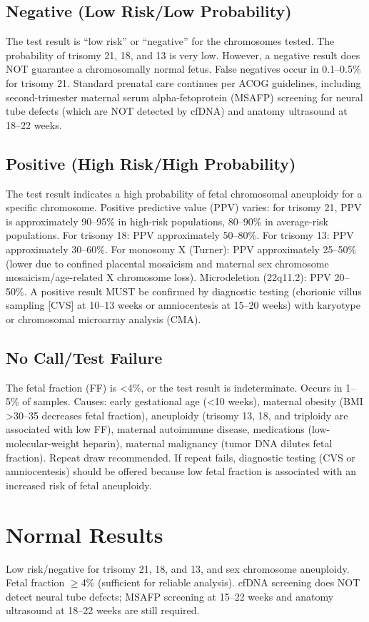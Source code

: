 \subsection*{Negative (Low Risk/Low Probability)}
The test result is ``low risk'' or ``negative'' for the chromosomes tested. The probability of trisomy 21, 18, and 13 is very low. However, a negative result does NOT guarantee a chromosomally normal fetus. False negatives occur in 0.1--0.5\% for trisomy 21. Standard prenatal care continues per ACOG guidelines, including second-trimester maternal serum alpha-fetoprotein (MSAFP) screening for neural tube defects (which are NOT detected by cfDNA) and anatomy ultrasound at 18--22 weeks.

\subsection*{Positive (High Risk/High Probability)}
The test result indicates a high probability of fetal chromosomal aneuploidy for a specific chromosome. Positive predictive value (PPV) varies: for trisomy 21, PPV is approximately 90--95\% in high-risk populations, 80--90\% in average-risk populations. For trisomy 18: PPV approximately 50--80\%. For trisomy 13: PPV approximately 30--60\%. For monosomy X (Turner): PPV approximately 25--50\% (lower due to confined placental mosaicism and maternal sex chromosome mosaicism/age-related X chromosome loss). Microdeletion (22q11.2): PPV 20--50\%. A positive result MUST be confirmed by diagnostic testing (chorionic villus sampling [CVS] at 10--13 weeks or amniocentesis at 15--20 weeks) with karyotype or chromosomal microarray analysis (CMA).

\subsection*{No Call/Test Failure}
The fetal fraction (FF) is <4\%, or the test result is indeterminate. Occurs in 1--5\% of samples. Causes: early gestational age (<10 weeks), maternal obesity (BMI >30--35 decreases fetal fraction), aneuploidy (trisomy 13, 18, and triploidy are associated with low FF), maternal autoimmune disease, medications (low-molecular-weight heparin), maternal malignancy (tumor DNA dilutes fetal fraction). Repeat draw recommended. If repeat fails, diagnostic testing (CVS or amniocentesis) should be offered because low fetal fraction is associated with an increased risk of fetal aneuploidy.

\section*{Normal Results}
Low risk/negative for trisomy 21, 18, and 13, and sex chromosome aneuploidy. Fetal fraction $\geq$4\% (sufficient for reliable analysis). cfDNA screening does NOT detect neural tube defects; MSAFP screening at 15--22 weeks and anatomy ultrasound at 18--22 weeks are still required.

